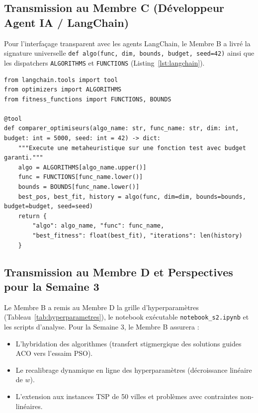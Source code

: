 \documentclass[11pt,a4paper]{article}
\begin{document}
\subsection{Transmission au Membre C (Développeur Agent IA / LangChain)}
Pour l'interfaçage transparent avec les agents LangChain, le Membre B a livré la signature universelle \texttt{def algo(func, dim, bounds, budget, seed=42)} ainsi que les dispatchers \texttt{ALGORITHMS} et \texttt{FUNCTIONS} (Listing~\ref{lst:langchain}).

\begin{lstlisting}[caption={Outil LangChain prêt à l'emploi (\texttt{HANDOFF\_NOTES.md})}, label={lst:langchain}]
from langchain.tools import tool
from optimizers import ALGORITHMS
from fitness_functions import FUNCTIONS, BOUNDS

@tool
def comparer_optimiseurs(algo_name: str, func_name: str, dim: int, budget: int = 5000, seed: int = 42) -> dict:
    """Execute une metaheuristique sur une fonction test avec budget garanti."""
    algo = ALGORITHMS[algo_name.upper()]
    func = FUNCTIONS[func_name.lower()]
    bounds = BOUNDS[func_name.lower()]
    best_pos, best_fit, history = algo(func, dim=dim, bounds=bounds, budget=budget, seed=seed)
    return {
        "algo": algo_name, "func": func_name,
        "best_fitness": float(best_fit), "iterations": len(history)
    }
\end{lstlisting}

\subsection{Transmission au Membre D et Perspectives pour la Semaine 3}
Le Membre B a remis au Membre D la grille d'hyperparamètres (Tableau~\ref{tab:hyperparametres}), le notebook exécutable \texttt{notebook\_s2.ipynb} et les scripts d'analyse. Pour la Semaine 3, le Membre B assurera :
\begin{itemize}\setlength{\itemsep}{0.1em}
    \item L'hybridation des algorithmes (transfert stigmergique des solutions guides ACO vers l'essaim PSO).
    \item Le recalibrage dynamique en ligne des hyperparamètres (décroissance linéaire de $w$).
    \item L'extension aux instances TSP de 50 villes et problèmes avec contraintes non-linéaires.
\end{itemize}

\end{document}
